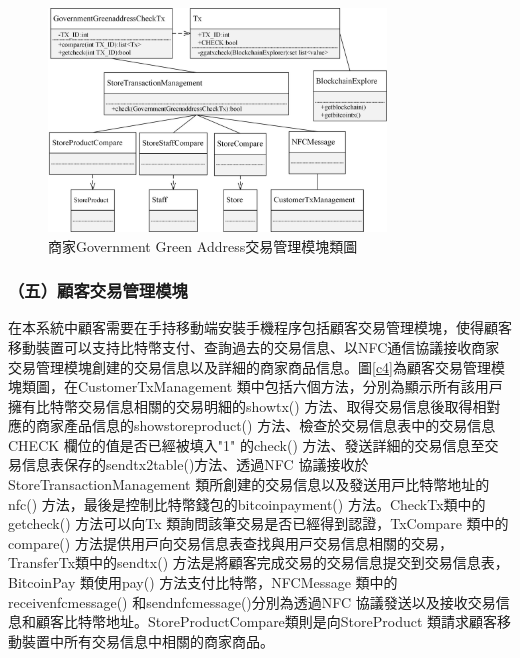 	

	\begin{figure}[!htbp]
		\centering
		\includegraphics[width = 0.8\textwidth]{c7.jpg}
		\caption{商家Government Green Address交易管理模塊類圖}\label{c7}
	\end{figure}



\subsubsection{（五）顧客交易管理模塊}
在本系統中顧客需要在手持移動端安裝手機程序包括顧客交易管理模塊，使得顧客移動裝置可以支持比特幣支付、查詢過去的交易信息、以NFC通信協議接收商家交易管理模塊創建的交易信息以及詳細的商家商品信息。圖\ref{c4}為顧客交易管理模塊類圖，在CustomerTxManagement 類中包括六個⽅法，分別為顯⽰所有該⽤⼾擁有⽐特幣交易信息相關的交易明細的showtx() ⽅法、取得交易信息後取得相對應的商家產品信息的showstoreproduct() ⽅法、檢查於交易信息表中的交易信息CHECK 欄位的值是否已經被填⼊"1" 的check() ⽅法、發送詳細的交易信息⾄交易信息表保存的sendtx2table()⽅法、透過NFC 協議接收於StoreTransactionManagement 類所創建的交易信息以及發送⽤⼾⽐特幣地址的nfc() ⽅法，最後是控制⽐特幣錢包的bitcoinpayment() ⽅法。CheckTx類中的getcheck() ⽅法可以向Tx 類詢問該筆交易是否已經得到認證，TxCompare 類中的compare() ⽅法提供⽤⼾向交易信息表查找與⽤⼾交易信息相關的交易，TransferTx類中的sendtx() ⽅法是將顧客完成交易的交易信息提交到交易信息表，BitcoinPay 類使⽤pay() ⽅法⽀付⽐特幣，NFCMessage 類中的receivenfcmessage() 和sendnfcmessage()分別為透過NFC 協議發送以及接收交易信息和顧客⽐特幣地址。StoreProductCompare類則是向StoreProduct 類請求顧客移動裝置中所有交易信息中相關的商家商品。

